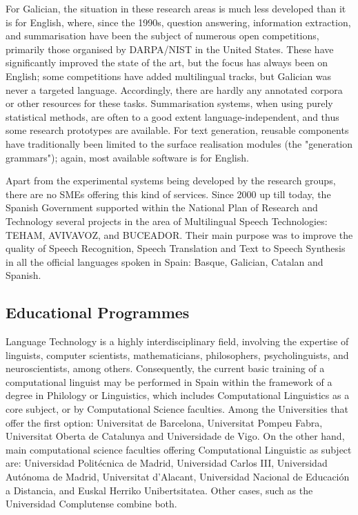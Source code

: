 \begin{multicols}{2}

For Galician, the situation in these research areas is much less developed than it is for English, where, since the 1990s, question answering, information extraction, and summarisation have been the subject of numerous open competitions, primarily those organised by DARPA/NIST in the United States. These have significantly improved the state of the art, but the focus has always been on English; some competitions have added multilingual tracks, but Galician was never a targeted language. Accordingly, there are hardly any annotated corpora or other resources for these tasks. Summarisation systems, when using purely statistical methods, are often to a good extent language-independent, and thus some research prototypes are available. For text generation, reusable components have traditionally been limited to the surface realisation modules (the "generation grammars"); again, most available software is for English. 

Apart from the experimental systems being developed by the research groups, there are no SMEs offering this kind of services. Since 2000 up till today, the Spanish Government supported within the National Plan of Research and Technology several projects in the area of Multilingual Speech Technologies: TEHAM, AVIVAVOZ, and BUCEADOR. Their main purpose was to improve the quality of Speech Recognition, Speech Translation and Text to Speech Synthesis in all the official languages spoken in Spain: Basque, Galician, Catalan and Spanish.


\subsection{Educational Programmes}

   Language Technology is a highly interdisciplinary field, involving the expertise of linguists, computer scientists, mathematicians, philosophers, psycholinguists, and neuroscientists, among others. Consequently, the current basic training of a computational linguist may be performed in Spain within the framework of a degree in Philology or Linguistics, which includes Computational Linguistics as a core subject, or by Computational Science faculties. Among the Universities that offer the first option: Universitat de Barcelona, Universitat Pompeu Fabra, Universitat Oberta de Catalunya and Universidade de Vigo. On the other hand, main computational science faculties offering Computational Linguistic as subject are: Universidad Politécnica de Madrid, Universidad Carlos III, Universidad Autónoma de Madrid, Universitat d’Alacant, Universidad Nacional de Educación a Distancia, and Euskal Herriko Unibertsitatea. Other cases, such as the Universidad Complutense combine both.


\end{multicols}
